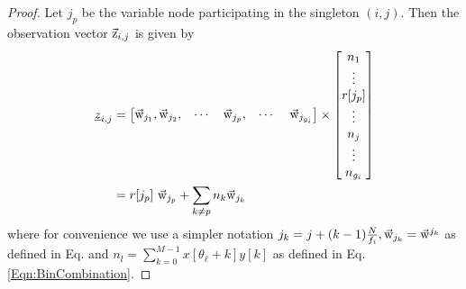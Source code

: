 \begin{proof}
	
	Let $j_p$ be the variable node participating in the singleton $(i,j)$. Then the observation vector $\vec{\mathrm{z}}_{i,j}$ is given by
	\begin{align*}
	\underline{z}_{i,j} &= \begin{bmatrix}
	\wv_{j_{1}},\wv_{j_2}, & \cdots   & \wv_{j_p}, &\cdots \ &\wv_{j_{g_i}}
	\end{bmatrix} \times
	\begin{bmatrix}
	n_{1} \\
	\vdots \\
	r[j_p]\\
	\vdots\\
	n_{j} \\
	\vdots\\
	n_{g_i}\\
	\end{bmatrix}\\
	&= r[j_p] ~ \wv_{j_p}+ \sum_{k \neq p}n_k \wv_{j_k} \\
	\end{align*}
	where for convenience we use a simpler notation $j_k=j+(k-1)\frac{N}{f_i}, \vec{\mathrm{w}}_{j_k}=\vec{\mathrm{w}}^{j_k}$ as defined in Eq. and $n_{l}=\sum\limits_{k=0}^{M-1}x[\theta_{\ell}+k]y[k]$ as defined in Eq. \eqref{Eqn:BinCombination}.
	

\end{proof}
